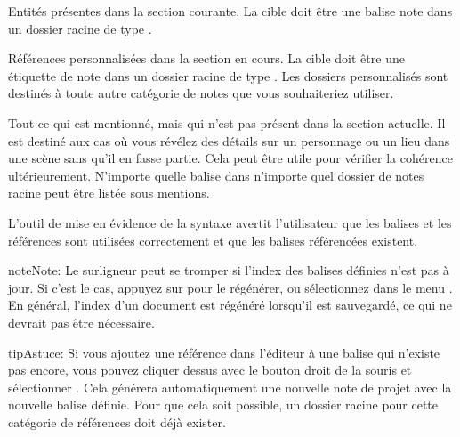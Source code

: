 \documentclass[a4paper,11pt,french]{sphinxmanual}
\begin{document}
\begin{description}
\sphinxAtStartPar
Entités présentes dans la section courante. La cible doit être une balise note dans un dossier racine de type .

\sphinxAtStartPar
Références personnalisées dans la section en cours. La cible doit être une étiquette de note dans un dossier racine de type . Les dossiers personnalisés sont destinés à toute autre catégorie de notes que vous souhaiteriez utiliser.

\sphinxAtStartPar
Tout ce qui est mentionné, mais qui n’est pas présent dans la section actuelle. Il est destiné aux cas où vous révélez des détails sur un personnage ou un lieu dans une scène sans qu’il en fasse partie. Cela peut être utile pour vérifier la cohérence ultérieurement. N’importe quelle balise dans n’importe quel dossier de notes racine peut être listée sous mentions.

\end{description}

\sphinxAtStartPar
L’outil de mise en évidence de la syntaxe avertit l’utilisateur que les balises et les références sont utilisées correctement et que les balises référencées existent.

\begin{sphinxadmonition}{note}{Note:}
\sphinxAtStartPar
Le surligneur peut se tromper si l’index des balises définies n’est pas à jour. Si c’est le cas, appuyez sur  pour le régénérer, ou sélectionnez  dans le menu . En général, l’index d’un document est régénéré lorsqu’il est sauvegardé, ce qui ne devrait pas être nécessaire.
\end{sphinxadmonition}

\begin{sphinxadmonition}{tip}{Astuce:}
\sphinxAtStartPar
Si vous ajoutez une référence dans l’éditeur à une balise qui n’existe pas encore, vous pouvez cliquer dessus avec le bouton droit de la souris et sélectionner . Cela générera automatiquement une nouvelle note de projet avec la nouvelle balise définie. Pour que cela soit possible, un dossier racine pour cette catégorie de références doit déjà exister.
\end{sphinxadmonition}
\end{document}
